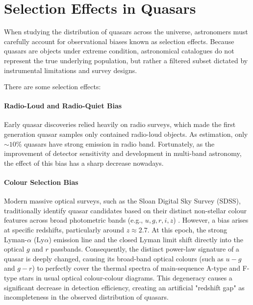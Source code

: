 \section{Selection Effects in Quasars}

When studying the distribution of quasars across the universe, astronomers must carefully account for observational biases known as selection effects. Because quasars are objects under extreme condition, astronomical catalogues do not represent the true underlying population, but rather a filtered subset dictated by instrumental limitations and survey designs.

There are some selection effects:

\paragraph{Radio-Loud and Radio-Quiet Bias} Early quasar discoveries relied heavily on radio surveys, which made the first generation quasar samples only contained radio-loud objects. As \citet{kellermannVLAObservationsObjects1989,ivezicOpticalRadioProperties2002} estimation, only $\sim10\%$ quasars have strong emission in radio band. Fortunately, as the improvement of detector sensitivity and development in multi-band astronomy, the effect of this bias has a sharp decrease nowadays.

\paragraph{Colour Selection Bias} Modern massive optical surveys, such as the Sloan Digital Sky Survey (SDSS), traditionally identify quasar candidates based on their distinct non-stellar colour features across broad photometric bands (e.g., $u, g, r, i, z$) \citep{richardsSpectroscopicTargetSelection2002}. However, a bias arises at specific redshifts, particularly around $z \approx 2.7$. At this epoch, the strong Lyman-$\alpha$ ($\text{Ly}\alpha$) emission line and the closed Lyman limit shift directly into the optical $g$ and $r$ passbands. Consequently, the distinct power-law signature of a quasar is deeply changed, causing its broad-band optical colours (such as $u-g$ and $g-r$) to perfectly cover the thermal spectra of main-sequence A-type and F-type stars in usual optical colour-colour diagrams. This degeneracy causes a significant decrease in detection efficiency, creating an artificial "redshift gap" as incompleteness in the observed distribution of quasars.

